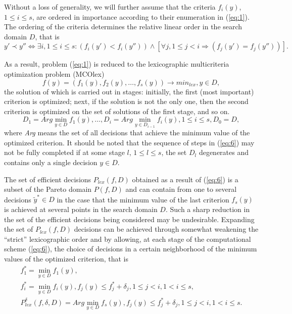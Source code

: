 \documentclass[smallextended]{svjour3}       %
\begin{document}
Without a loss of generality, we will further assume that the criteria $f_i(y)$, $1 \leq i \leq s$, are ordered in importance according to their enumeration in (\ref{eq:1}). The ordering of the criteria determines the relative linear order in the search domain $D$, that is
\begin{equation}\label{eq:4d}
y' \prec y'' \Leftrightarrow \exists i, 1 \leq i \leq s: (f_i(y')<f_i(y'')) \wedge [ \forall j, 1 \leq j <i \Rightarrow (f_j(y')=f_j(y'')) ].
\end{equation}

As a result, problem (\ref{eq:1}) is reduced to the lexicographic multicriteria optimization problem (MCOlex)
\begin{equation}\label{eq:5}
f(y) = (f_1(y), f_2(y), \dots , f_s(y)) \to min_{lex},  y \in D,
\end{equation}
the solution of which is carried out in stages: initially, the first (most important) criterion is optimized; next, if the solution is not the only one, then the second criterion is optimized on the set of solutions of the first stage, and so on.
\begin{equation}\label{eq:6}
D_1=Arg \min_{y \in D}{f_1(y)},\dots, D_i=Arg \min_{y \in D_{i-1}}{f_i(y)},1 \leq i \leq s,D_0=D,
\end{equation}
where \textit{Arg} means the set of all decisions that achieve the minimum value of the optimized criterion. It should be noted that the sequence of steps in (\ref{eq:6}) may not be fully completed if at some stage $l$, $1 \leq l \leq s$, the set $D_l$ degenerates and contains only a single decision $y \in D$.

The set of efficient decisions $P_{lex}(f,D)$ obtained as a result of (\ref{eq:6}) is a subset of the Pareto domain $P(f,D)$ and can contain from one to several decisions $\widetilde{y}^* \in D$ in the case that the minimum value of the last criterion $f_s(y)$ is achieved at several points in the search domain $D$. Such a sharp reduction in the set of the efficient decisions being considered may be undesirable. Expanding the set of $P_{lex}(f,D)$ decisions can be achieved through somewhat weakening the ``strict'' lexicographic order and by allowing, at each stage of the computational scheme (\ref{eq:6}), the choice of decisions in a certain neighborhood of the minimum values of the optimized criterion, that is
\begin{equation}\label{eq:7}
\begin{matrix}
f^*_1 =\min_{y \in D}{f_1(y)},  \\
f^*_i =\min_{y \in D}{f_i(y)},  f_j(y) \leq f^*_j + \delta_j, 1 \leq j < i, 1 < i \leq s, \\
P_{lex}^\delta(f,\delta,D) = Arg \min_{y \in D}{f_s(y)},f_j(y) \leq f^*_j + \delta_j, 1 \leq j < i, 1 < i \leq s.
\end{matrix}
\end{equation}
\end{document}
